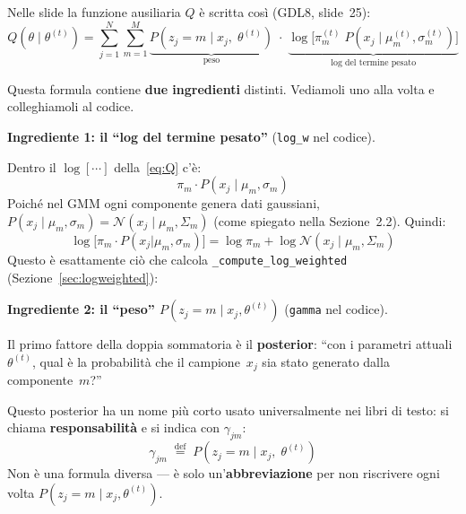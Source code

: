 \documentclass[11pt,a4paper]{article}
\newcommand{\refslide}[2]{\textsc{#1}, slide~#2}
\begin{document}
\begin{infobox}

Nelle slide la funzione ausiliaria $Q$ \`{e} scritta cos\`{i}
(\refslide{GDL8}{25}):
\begin{equation}\label{eq:Q}
  Q(\theta \mid \theta^{(t)})
  = \sum_{j=1}^{N}\sum_{m=1}^{M}
    \underbrace{P(z_j = m \mid x_j,\;\theta^{(t)})}_{\text{peso}}
    \;\cdot\;
    \underbrace{\log\!\bigl[
      \pi_m^{(t)}\;
      P(x_j \mid \mu_m^{(t)}, \sigma_m^{(t)})
    \bigr]}_{\text{log del termine pesato}}
\end{equation}

Questa formula contiene \textbf{due ingredienti} distinti.
Vediamoli uno alla volta e colleghiamoli al codice.

\bigskip
\textbf{Ingrediente 1: il ``log del termine pesato''}
(\texttt{log\_w} nel codice).

Dentro il $\log[\cdots]$ della~\eqref{eq:Q} c'\`{e}:
\[
  \pi_m \cdot P(x_j \mid \mu_m, \sigma_m)
\]
Poich\'{e} nel GMM ogni componente genera dati gaussiani,
$P(x_j \mid \mu_m, \sigma_m) = \mathcal{N}(x_j \mid \mu_m, \Sigma_m)$
(come spiegato nella Sezione~2.2). Quindi:
\[
  \log\!\bigl[\pi_m \cdot P(x_j|\mu_m,\sigma_m)\bigr]
  = \log\pi_m + \log\mathcal{N}(x_j \mid \mu_m, \Sigma_m)
\]
Questo \`{e} esattamente ci\`{o} che calcola
\texttt{\_compute\_log\_weighted} (Sezione~\ref{sec:logweighted}):

\medskip
\begin{center}
\end{center}

\bigskip
\textbf{Ingrediente 2: il ``peso'' $P(z_j = m \mid x_j, \theta^{(t)})$}
(\texttt{gamma} nel codice).

Il primo fattore della doppia sommatoria \`{e} il
\textbf{posterior}: ``con i parametri attuali $\theta^{(t)}$,
qual \`{e} la probabilit\`{a} che il campione~$x_j$ sia stato generato
dalla componente~$m$?''

Questo posterior ha un nome pi\`{u} corto usato universalmente nei
libri di testo: si chiama \textbf{responsabilit\`{a}} e si indica
con $\gamma_{jm}$:
\[
  \gamma_{jm}
  \;\stackrel{\text{def}}{=}\;
  P(z_j = m \mid x_j,\;\theta^{(t)})
\]
Non \`{e} una formula diversa --- \`{e} solo un'\textbf{abbreviazione}
per non riscrivere ogni volta $P(z_j = m \mid x_j, \theta^{(t)})$.


\end{infobox}
\end{document}
